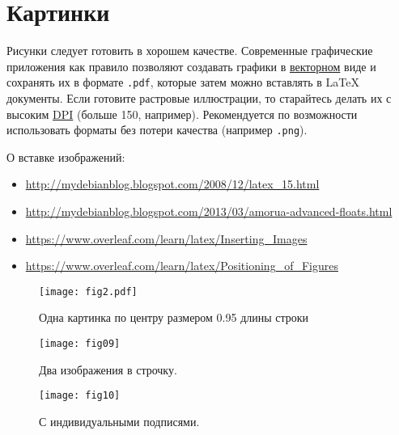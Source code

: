 \chapter{Картинки}\label{ch:fig}

Рисунки следует готовить в хорошем качестве. Современные графические приложения как правило позволяют создавать графики в \href{
https://ru.wikipedia.org/wiki/%
}{векторном} виде и сохранять их в формате \verb|.pdf|, которые затем можно вставлять в \LaTeX\, документы. Если готовите растровые иллюстрации, то старайтесь делать их с высоким \href{https://ru.wikipedia.org/wiki/Dots_per_inch}{DPI} (больше 150, например). Рекомендуется по возможности  использовать форматы без потери качества (например \verb|.png|).

О вставке изображений:

\begin{itemize}
	\item \href{http://mydebianblog.blogspot.com/2008/12/latex_15.html}{http://mydebianblog.blogspot.com/2008/12/latex\_15.html}
	\item \href{http://mydebianblog.blogspot.com/2013/03/amorua-advanced-floats.html}{http://mydebianblog.blogspot.com/2013/03/amorua-advanced-floats.html}
	\item \href{https://www.overleaf.com/learn/latex/Inserting_Images}{https://www.overleaf.com/learn/latex/Inserting\_Images}
	\item \href{https://www.overleaf.com/learn/latex/Positioning_of_Figures}{https://www.overleaf.com/learn/latex/Positioning\_of\_Figures}
\end{itemize}







\begin{figure}[h]
	\centering
	\texttt{[image: fig2.pdf]}
	\caption{Одна картинка по центру размером 0.95 длины строки}
	\label{fig:image1}%
\end{figure}


\begin{figure}[h]
	\begin{center}
		\begin{minipage}[h]{0.45\linewidth}
			\texttt{[image: fig09]}
			\caption{Два изображения в строчку.} %
			\label{fig:image2} %
		\end{minipage}
		\hfill
		\begin{minipage}[h]{0.45\linewidth}
			\texttt{[image: fig10]}
			\caption{С индивидуальными подписями.}
			\label{fig:image3}
		\end{minipage}
	\end{center}
\end{figure}


